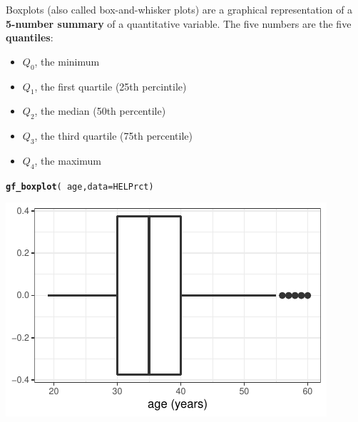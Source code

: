 \documentclass[twoside]{book}\usepackage[]{graphicx}\usepackage[]{xcolor}
\makeatletter
\def\maxwidth{ %
  \ifdim\Gin@nat@width>\linewidth
    \linewidth
  \else
    \Gin@nat@width
  \fi
}
\newcommand{\hlopt}[1]{\textcolor[rgb]{0,0,0}{#1}}%
\newcommand{\hlstd}[1]{\textcolor[rgb]{0.345,0.345,0.345}{#1}}%
\newcommand{\hlkwc}[1]{\textcolor[rgb]{0.333,0.667,0.333}{#1}}%
\newcommand{\hlkwd}[1]{\textcolor[rgb]{0.737,0.353,0.396}{\textbf{#1}}}%
\newenvironment{kframe}{%
 \def\at@end@of@kframe{}%
 \ifinner\ifhmode%
  \def\at@end@of@kframe{\end{minipage}}%
  \begin{minipage}{\columnwidth}%
 \fi\fi%
 \def\FrameCommand##1{\hskip\@totalleftmargin \hskip-\fboxsep
 \colorbox{shadecolor}{##1}\hskip-\fboxsep
     \hskip-\linewidth \hskip-\@totalleftmargin \hskip\columnwidth}%
 \MakeFramed {\advance\hsize-\width
   \@totalleftmargin\z@ \linewidth\hsize
   \@setminipage}}%
 {\par\unskip\endMakeFramed%
 \at@end@of@kframe}
\newenvironment{knitrout}{}{} %
\def\term#1{\textbf{#1}}
\makeatother
\begin{document}
Boxplots (also called box-and-whisker plots) are a graphical representation of a 
\term{5-number summary} of a quantitative variable.  The five numbers are
the five \term{quantiles}:
\begin{itemize}
	\item $Q_0$, the minimum
	\item $Q_1$, the first quartile (25th percintile) 
	\item $Q_2$, the median (50th percentile)
	\item $Q_3$, the third quartile (75th percentile)
	\item $Q_4$, the maximum
\end{itemize}
\begin{knitrout}
\color{fgcolor}\begin{kframe}
\begin{alltt}
\hlkwd{gf_boxplot}\hlstd{(}\hlopt{~}\hlstd{age,} \hlkwc{data}\hlstd{=HELPrct)}
\end{alltt}
\end{kframe}

{\centering \includegraphics[width=\maxwidth]{figures/fig-bwplot-1} 

}



\end{knitrout}
\end{document}
